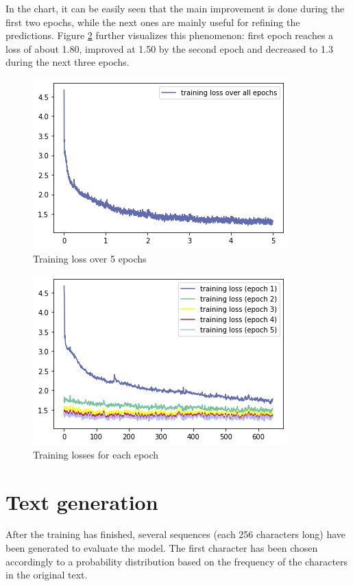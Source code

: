 \documentclass[12pt]{article}
\begin{document}
In the chart, it can be easily seen that the main improvement is done during the first two epochs, while the next ones are mainly useful for refining the predictions. Figure \ref{fig:loss-epochs} further visualizes this phenomenon: first epoch reaches a loss of about 1.80, improved at 1.50 by the second epoch and decreased to 1.3 during the next three epochs.

\begin{figure}[H]
	\centering
	\includegraphics[scale=1]{images/00_loss.png}
	\caption[Training loss over 5 epochs]{Training loss over 5 epochs}
	\label{fig:loss-total}
\end{figure}

\begin{figure}[H]
\centering
\includegraphics[scale=1]{images/02_loss_all_epochs.png}
\caption[Training loss over 5 epochs]{Training losses for each epoch}
\label{fig:loss-epochs}
\end{figure}




\section{Text generation}

After the training has finished, several sequences (each 256 characters long) have been generated to evaluate the model. The first character has been chosen accordingly to a probability distribution based on the frequency of the characters in the original text.
\end{document}
